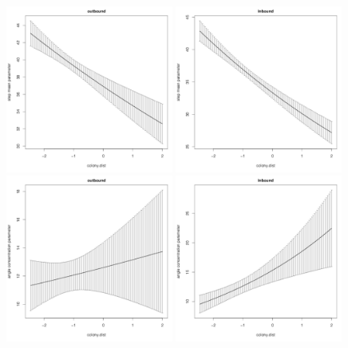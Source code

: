 \documentclass[12pt]{article}\usepackage[]{graphicx}\usepackage[]{xcolor}
\begin{document}
\begin{figure}[htbp]
  \centering
  \includegraphics[width=0.49\textwidth]{plot_sesResults001.pdf}
  \includegraphics[width=0.49\textwidth]{plot_sesResults003.pdf}\\
  \includegraphics[width=0.49\textwidth]{plot_sesResults007.pdf}
  \includegraphics[width=0.49\textwidth]{plot_sesResults009.pdf}\\

\end{figure}
\end{document}
